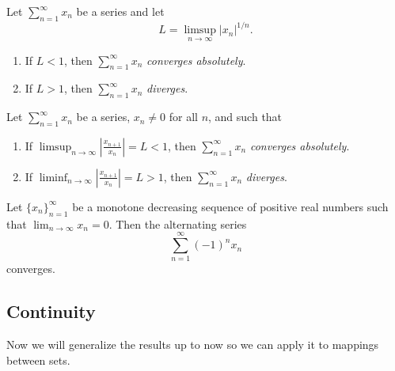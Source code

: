 \documentclass[../main.tex]{subfiles}
\begin{document}
    
    
    
    
    
    \begin{proposition}\label{prp:root_test}
    Let $\sum_{n=1}^{\infty} x_n$ be a series and let
    \[
    L = \limsup_{n \to \infty} |x_n|^{1/n}.
    \]
    \begin{enumerate}
        \item If $L < 1$, then $\sum_{n=1}^{\infty} x_n$ \textit{converges absolutely}.
        \item If $L > 1$, then $\sum_{n=1}^{\infty} x_n$ \textit{diverges}.
    \end{enumerate}
    \end{proposition}
    
    
    
    
    
    
    
    \begin{proposition}\label{prp:ratio_test_Series}
    Let $\sum_{n=1}^{\infty} x_n$ be a series, $x_n \neq 0$ for all $n$, and such that
    \begin{enumerate}
        \item If $\limsup_{n \to \infty} \left| \frac{x_{n+1}}{x_n} \right|  = L < 1$, then $\sum_{n=1}^{\infty} x_n$ \textit{converges absolutely}.
        \item If $\liminf_{n \to \infty} \left| \frac{x_{n+1}}{x_n} \right|  = L > 1$, then $\sum_{n=1}^{\infty} x_n$ \textit{diverges}.
    \end{enumerate}
    \end{proposition}
    
    
    
    
    
    
    \begin{proposition}\label{prp:alt_series_test}
    Let \( \{x_n\}_{n=1}^\infty \) be a monotone decreasing sequence of positive real numbers such that \(\lim_{n \to \infty} x_n = 0\). Then the alternating series
    \[
    \sum_{n=1}^\infty (-1)^n x_n
    \]
    converges.
    \end{proposition}
    
    
    
    
    \subsection{Continuity}
    
    \begin{remark}
    Now we will generalize the results up to now so we can apply it to mappings between sets. 
    \end{remark}
    
\end{document}
